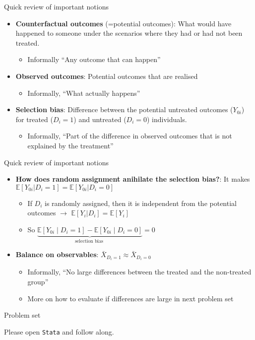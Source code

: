 \documentclass[aspectratio=169, 11pt]{beamer}
\begin{document}
\begin{frame}{Quick review of important notions}
    \begin{itemize}[<+->]
        \item \textbf{Counterfactual outcomes} (=potential outcomes): What would have happened to someone under the scenarios where they had or had not been treated.
        \begin{itemize}
            \item Informally ``Any outcome that can happen''
        \end{itemize}
        \item \textbf{Observed outcomes}: Potential outcomes that are realised
        \begin{itemize}
            \item Informally, ``What actually happens''
        \end{itemize}
        \item \textbf{Selection bias}: Difference between the potential untreated outcomes ($Y_{0i}$) for treated ($D_i=1$) and untreated ($D_i=0$) individuals.
        \begin{itemize}
            \item Informally, ``Part of the difference in observed outcomes that is not explained by the treatment''
        \end{itemize}
    \end{itemize}
\end{frame}

\begin{frame}{Quick review of important notions}
    \begin{itemize}[<+->]
        \item \textbf{How does random assignment anihilate the selection bias?}: It makes $\mathbb{E}[Y_{0i}|D_i= 1] = \mathbb{E}[Y_{0i}|D_i= 0] $ 
        \begin{itemize}
            \item If $D_i$ is randomly assigned, then it is independent from the potential outcomes $\rightarrow$ $\mathbb{E}[Y_{i}|D_i] = \mathbb{E}[Y_{i}]$
            \item So $\underbrace{\mathbb{E}\left[Y_{0 i} \mid D_{i}=1\right]-\mathbb{E}\left[Y_{0 i} \mid D_{i}=0\right]}_{\text {selection bias }} = 0$ 
        \end{itemize}
        \item \textbf{Balance on observables}: $\bar{X}_{D_i=1} \approx \bar{X}_{D_i=0}$
        \begin{itemize}
            \item Informally, ``No large differences between the treated and the non-treated group''
            \item More on how to evaluate if differences are large in next problem set
        \end{itemize}
    \end{itemize}
\end{frame}

\begin{frame}{Problem set}
\begin{center}
    Please open \texttt{Stata} and follow along.
\end{center}
 
\end{frame}
\end{document}
